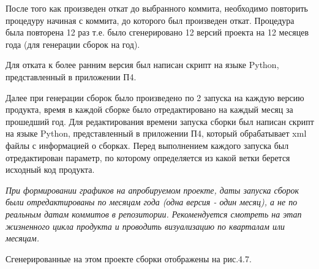 После того как произведен откат до выбранного коммита, необходимо повторить процедуру начиная с коммита, до которого был произведен откат. Процедура была повторена 12 раз т.е. было сгенерировано 12 версий проекта на 12 месяцев года (для генерации сборок на год).

Для отката к более ранним версия был написан скрипт на языке Python, представленный в приложении П4.

Далее при генерации сборок было произведено по 2 запуска на каждую версию продукта, время в каждой сборке было отредактировано на каждый месяц за прошедший год. Для редактирования времени запуска сборки был написан скрипт на языке Python, представленный в приложении П4, который обрабатывает xml файлы с информацией о сборках. Перед выполнением каждого запуска был отредактирован параметр, по которому определяется из какой ветки берется исходный код продукта.

\textit{При формировании графиков на апробируемом проекте, даты запуска сборок были отредактированы по месяцам года (одна версия - один месяц), а не по реальным датам коммитов в репозитории. Рекомендуется смотреть на этап жизненного цикла продукта и проводить визуализацию по кварталам или месяцам.}





Сгенерированные на этом проекте сборки отображены на рис.4.7.

